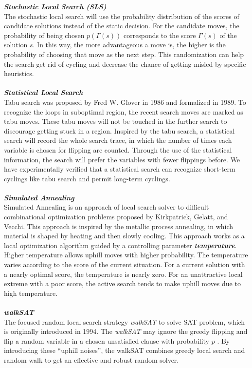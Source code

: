 \documentclass[12pt,a4paper,twoside]{scrartcl}
\numberwithin{equation}{section}
\begin{document}
\emph{\textbf{Stochastic Local Search (SLS)}}\\
The stochastic local search will use the probability distribution of the scores of candidate solutions instead of the static decision. For the candidate moves, the probability of being chosen $p(\Gamma(s))$ corresponds to the score $\Gamma(s)$ of the solution $s$. In this way, the more advantageous a move is, the higher is the probability of choosing that move as the next step. This randomization can help the search get rid of cycling and decrease the chance of getting misled by specific heuristics.\\
\\
\emph{\textbf{Statistical Local Search }}\\
 Tabu search was proposed by Fred W. Glover in 1986 and formalized in 1989\cite{glover1989tabu}. To recognize the loops in suboptimal region, the recent search moves are marked as tabu moves. These tabu moves will not be touched in the further search to discourage getting stuck in a region. Inspired by the tabu search, a statistical search will record the whole search trace, in which the number of times each variable is chosen for flipping are counted. Through the use of the statistical information, the search will prefer the variables with fewer flippings before. We have experimentally verified that a statistical search can recognize short-term cyclings like tabu search and permit long-term cyclings\cite{lisolving}.\\
\\
\emph{\textbf{Simulated Annealing}}\\
Simulated Annealing is an approach of local search solver to difficult combinational optimization problems proposed by Kirkpatrick, Gelatt, and Vecchi\cite{kirkpatrick1983optimization}. This approach is inspired by the metallic process annealing, in which material is shaped by heating and then slowly cooling. This approach works as a local optimization algorithm guided by a controlling parameter \emph{\textbf{temperature}}. Higher temperature allows uphill moves with higher probability. The temperature varies according to the score of the current situation.  For a current solution with a nearly optimal score, the temperature is nearly zero. For an unattractive local extreme with a poor score, the active search tends to make uphill moves due to high temperature.\\
\\
\emph{\textbf{walkSAT}}\\
The focused random local search strategy \emph{walkSAT} to solve SAT problem, which is originally introduced in 1994\cite{hoos2002adaptive}. The \emph{walkSAT} may ignore the greedy flipping and flip a random variable in a chosen unsatisfied clause with probability $p$ . By introducing these ``uphill noises'', the walkSAT combines greedy local search and random walk to get an effective and robust random solver. \\
\end{document}
